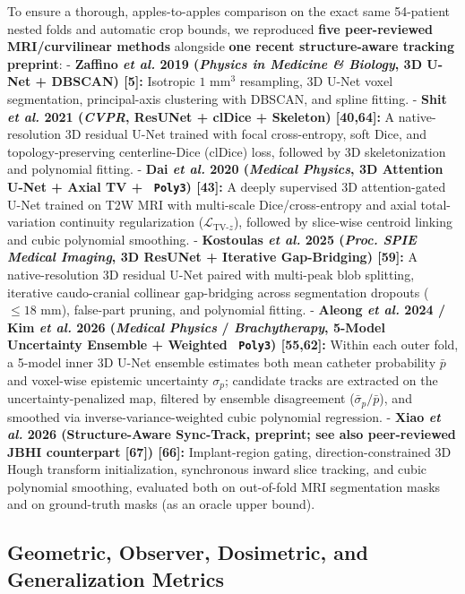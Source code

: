 \documentclass[
  11pt,
]{article}
\let\nforigtexttt\texttt
\renewcommand{\texttt}[1]{\nforigtexttt{\XeTeXinterchartokenstate=1 #1}}
\begin{document}
To ensure a thorough, apples-to-apples comparison on the exact same
54-patient nested folds and automatic crop bounds, we reproduced
\textbf{five peer-reviewed MRI/curvilinear methods} alongside
\textbf{one recent structure-aware tracking preprint}: - \textbf{Zaffino
\emph{et al.} 2019 (\emph{Physics in Medicine \& Biology}, 3D U-Net +
DBSCAN) {[}5{]}:} Isotropic \(1\text{ mm}^3\) resampling, 3D U-Net voxel
segmentation, principal-axis clustering with DBSCAN, and spline fitting.
- \textbf{Shit \emph{et al.} 2021 (\emph{CVPR}, ResUNet + clDice +
Skeleton) {[}40,64{]}:} A native-resolution 3D residual U-Net trained
with focal cross-entropy, soft Dice, and topology-preserving
centerline-Dice (clDice) loss, followed by 3D skeletonization and
polynomial fitting. - \textbf{Dai \emph{et al.} 2020 (\emph{Medical
Physics}, 3D Attention U-Net + Axial TV + \texttt{Poly3}) {[}43{]}:} A
deeply supervised 3D attention-gated U-Net trained on T2W MRI with
multi-scale Dice/cross-entropy and axial total-variation continuity
regularization (\(\mathcal{L}_{\text{TV-}z}\)), followed by slice-wise
centroid linking and cubic polynomial smoothing. - \textbf{Kostoulas
\emph{et al.} 2025 (\emph{Proc. SPIE Medical Imaging}, 3D ResUNet +
Iterative Gap-Bridging) {[}59{]}:} A native-resolution 3D residual U-Net
paired with multi-peak blob splitting, iterative caudo-cranial collinear
gap-bridging across segmentation dropouts (\(\le 18\text{ mm}\)),
false-part pruning, and polynomial fitting. - \textbf{Aleong \emph{et
al.} 2024 / Kim \emph{et al.} 2026 (\emph{Medical Physics} /
\emph{Brachytherapy}, 5-Model Uncertainty Ensemble + Weighted
\texttt{Poly3}) {[}55,62{]}:} Within each outer fold, a 5-model inner 3D
U-Net ensemble estimates both mean catheter probability \(\bar{p}\) and
voxel-wise epistemic uncertainty \(\sigma_p\); candidate tracks are
extracted on the uncertainty-penalized map, filtered by ensemble
disagreement (\(\bar{\sigma}_p/\bar{p}\)), and smoothed via
inverse-variance-weighted cubic polynomial regression. - \textbf{Xiao
\emph{et al.} 2026 (Structure-Aware Sync-Track, preprint; see also
peer-reviewed JBHI counterpart {[}67{]}) {[}66{]}:} Implant-region
gating, direction-constrained 3D Hough transform initialization,
synchronous inward slice tracking, and cubic polynomial smoothing,
evaluated both on out-of-fold MRI segmentation masks and on ground-truth
masks (as an oracle upper bound).

\subsection{Geometric, Observer, Dosimetric, and Generalization
Metrics}\label{geometric-observer-dosimetric-and-generalization-metrics}
\end{document}
